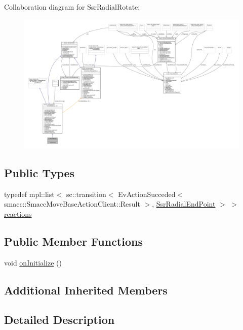 Collaboration diagram for Ssr\+Radial\+Rotate\+:
\nopagebreak
\begin{figure}[H]
\begin{center}
\leavevmode
\includegraphics[width=350pt]{structSsrRadialRotate__coll__graph}
\end{center}
\end{figure}
\subsection*{Public Types}
\begin{DoxyCompactItemize}
\item 
typedef mpl\+::list$<$ sc\+::transition$<$ Ev\+Action\+Succeded$<$ smacc\+::\+Smacc\+Move\+Base\+Action\+Client\+::\+Result $>$, \hyperlink{structSsrRadialEndPoint}{Ssr\+Radial\+End\+Point} $>$ $>$ \hyperlink{structSsrRadialRotate_a78a12dfae235f78a6bb41651fb6e74e5}{reactions}
\end{DoxyCompactItemize}
\subsection*{Public Member Functions}
\begin{DoxyCompactItemize}
\item 
void \hyperlink{structSsrRadialRotate_a91b3de3b25e4cf0d3a672f6ea344abea}{on\+Initialize} ()
\end{DoxyCompactItemize}
\subsection*{Additional Inherited Members}


\subsection{Detailed Description}


